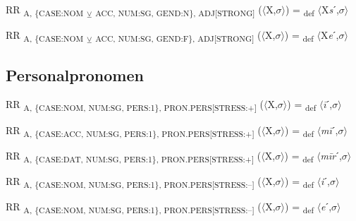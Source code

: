{\begin{exe}
 RR \textsubscript{A, \{CASE:NOM} \textsubscript{${\veebar}$}\textsubscript{ ACC, NUM:SG, GEND:N\}, ADJ[STRONG]} ($\langle$X,$\sigma $$\rangle$) = \textsubscript{def} $\langle$X\textit{s}ˊ,$\sigma $$\rangle$
\end{exe}

\begin{exe}
 RR \textsubscript{A, \{CASE:NOM} \textsubscript{${\veebar}$}\textsubscript{ ACC, NUM:SG, GEND:F\}, ADJ[STRONG]} ($\langle$X,$\sigma $$\rangle$) = \textsubscript{def} $\langle$X\textit{e}ˊ,$\sigma $$\rangle$
\end{exe}

\subsection{Personalpronomen}

\begin{exe}
 RR \textsubscript{A, \{CASE:NOM, NUM:SG, PERS:1\}, PRON.PERS[STRESS:+]} ($\langle$X,$\sigma $$\rangle$) = \textsubscript{def} $\langle$\textit{\=i}ˊ,$\sigma $$\rangle$
\end{exe}

\begin{exe}
 RR \textsubscript{A, \{CASE:ACC, NUM:SG, PERS:1\}, PRON.PERS[STRESS:+]} ($\langle$X,$\sigma $$\rangle$) = \textsubscript{def} $\langle$\textit{m\=i}ˊ,$\sigma $$\rangle$
\end{exe}

\begin{exe}
 RR \textsubscript{A, \{CASE:DAT, NUM:SG, PERS:1\}, PRON.PERS[STRESS:+]} ($\langle$X,$\sigma $$\rangle$) = \textsubscript{def} $\langle$\textit{m\=ir}ˊ,$\sigma $$\rangle$
\end{exe}

\begin{exe}
 RR \textsubscript{A, \{CASE:NOM, NUM:SG, PERS:1\}, PRON.PERS[STRESS:–]} ($\langle$X,$\sigma $$\rangle$) = \textsubscript{def} $\langle$\textit{i}ˊ,$\sigma $$\rangle$
\end{exe}

\begin{exe}
 RR \textsubscript{A, \{CASE:NOM, NUM:SG, PERS:1\}, PRON.PERS[STRESS:–]} ($\langle$X,$\sigma $$\rangle$) = \textsubscript{def} $\langle$\textit{e}ˊ,$\sigma $$\rangle$
\end{exe}

}
